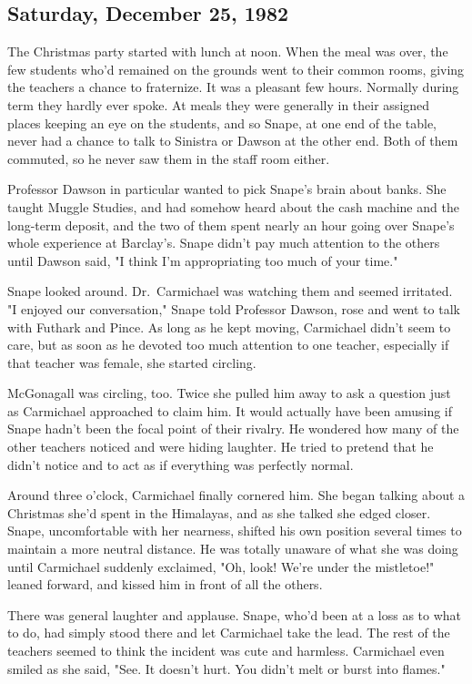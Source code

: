 \subsection{Saturday, December 25, 1982}

The Christmas party started with lunch at noon. When the meal was over, the few students who'd remained on the grounds went to their common rooms, giving the teachers a chance to fraternize. It was a pleasant few hours. Normally during term they hardly ever spoke. At meals they were generally in their assigned places keeping an eye on the students, and so Snape, at one end of the table, never had a chance to talk to Sinistra or Dawson at the other end. Both of them commuted, so he never saw them in the staff room either.

Professor Dawson in particular wanted to pick Snape's brain about banks. She taught Muggle Studies, and had somehow heard about the cash machine and the long-term deposit, and the two of them spent nearly an hour going over Snape's whole experience at Barclay's. Snape didn't pay much attention to the others until Dawson said, "I think I'm appropriating too much of your time."

Snape looked around. Dr.~Carmichael was watching them and seemed irritated. "I enjoyed our conversation," Snape told Professor Dawson, rose and went to talk with Futhark and Pince. As long as he kept moving, Carmichael didn't seem to care, but as soon as he devoted too much attention to one teacher, especially if that teacher was female, she started circling.

McGonagall was circling, too. Twice she pulled him away to ask a question just as Carmichael approached to claim him. It would actually have been amusing if Snape hadn't been the focal point of their rivalry. He wondered how many of the other teachers noticed and were hiding laughter. He tried to pretend that he didn't notice and to act as if everything was perfectly normal.

Around three o'clock, Carmichael finally cornered him. She began talking about a Christmas she'd spent in the Himalayas, and as she talked she edged closer. Snape, uncomfortable with her nearness, shifted his own position several times to maintain a more neutral distance. He was totally unaware of what she was doing until Carmichael suddenly exclaimed, "Oh, look! We're under the mistletoe!" leaned forward, and kissed him in front of all the others.

There was general laughter and applause. Snape, who'd been at a loss as to what to do, had simply stood there and let Carmichael take the lead. The rest of the teachers seemed to think the incident was cute and harmless. Carmichael even smiled as she said, "See. It doesn't hurt. You didn't melt or burst into flames."

